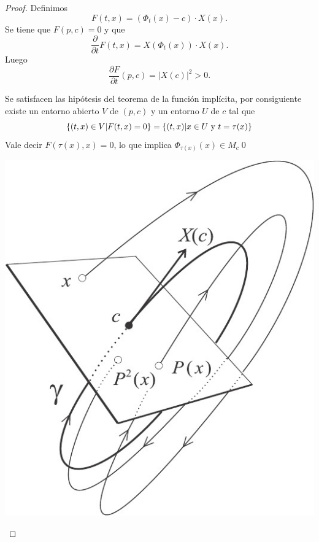 \begin{proof} Definimos
\[F(t,x)=(\Phi_t(x)-c)\cdot X(x).\]
Se tiene que $F(p,c)=0$ y que
\[\frac{\partial}{\partial t}F(t,x)=X(\Phi_t(x))\cdot X(x).\]
Luego
\[\frac{\partial F}{\partial t}(p,c)=|X(c)|^2>0.\]


Se satisfacen las hipótesis del teorema de la función implícita, por consiguiente existe un entorno abierto $V$ de $(p,c)$  y un entorno $U$ de $c$ tal que
\[\{(t,x)\in V|F(t,x)=0\}=\{(t,x)|x\in U\hbox{ y }t=\tau(x)\}\]
Vale decir $F(\tau(x),x)=0$, lo que implica $\Phi_{\tau(x)}(x)\in M_c$\qed


 
   \begin{center}
   \includegraphics[scale=0.3]{imagenes/poincaremap.jpg}
   \end{center}
\end{proof}

